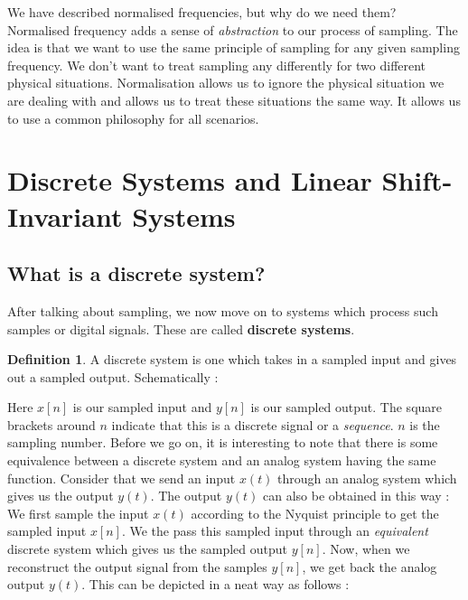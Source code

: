 \documentclass{article}
\theoremstyle{definition}
\newtheorem{defn}[theorem]{Definition}
\begin{document}
		We have described normalised frequencies, but why do we need them? Normalised frequency adds a sense of \textit{abstraction} to our process of sampling. The idea is that we want to use the same principle of sampling for any given sampling frequency. We don't want to treat sampling any differently for two different physical situations. Normalisation allows us to ignore the physical situation we are dealing with and allows us to treat these situations the same way. It allows us to use a common philosophy for all scenarios.
		\clearpage

\section{Discrete Systems and Linear Shift-Invariant Systems}

\subsection{What is a discrete system?}

After talking about sampling, we now move on to systems which process such samples or digital signals. These are called \textbf{discrete systems}. 
		
\begin{defn} A discrete system is one which takes in a sampled input and gives out a sampled output. Schematically :
		
		
\end{defn}

Here $x[n]$ is our sampled input and $y[n]$ is our sampled output. The square brackets around $n$ indicate that this is a discrete signal or a \textit{sequence}. $n$ is the sampling number. Before we go on, it is interesting to note that there is some equivalence between a discrete system and an analog system having the same function. Consider that we send an input $x(t)$ through an analog system which gives us the output $y(t)$. The output $y(t)$ can also be obtained in this way : We first sample the input $x(t)$ according to the Nyquist principle to get the sampled input $x[n]$. We the pass this sampled input through an \textit{equivalent} discrete system which gives us the sampled output $y[n]$. Now, when we reconstruct the output signal from the samples $y[n]$, we get back the analog output $y(t)$. This can be depicted in a neat way as follows : \\
\end{document}
